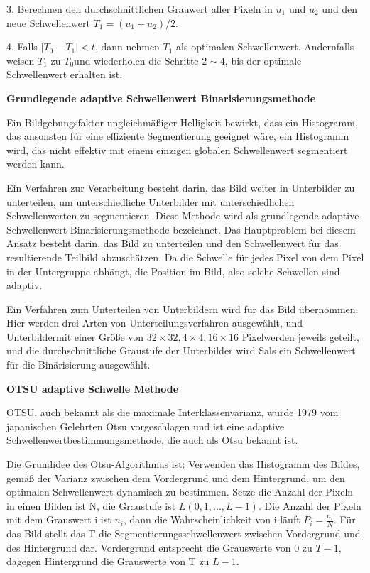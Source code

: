 3. Berechnen den durchschnittlichen Grauwert aller Pixeln in $ u_{1} $ und $ u_{2} $ und den neue Schwellenwert $ T_{1} = (u_{1}+u_{2})/2 $.

4. Falls $ |T_{0} - T_{1}| < t $, dann nehmen $ T_{1} $ als optimalen Schwellenwert. Andernfalls weisen $ T_{1} $ zu $ T_{0} $und wiederholen die Schritte $ 2\sim4 $, bis der optimale Schwellenwert erhalten ist.

\textbf{Grundlegende adaptive Schwellenwert Binarisierungsmethode}

Ein Bildgebungsfaktor ungleichmäßiger Helligkeit bewirkt, dass ein Histogramm, das ansonsten für eine effiziente Segmentierung geeignet wäre, ein Histogramm wird, das nicht effektiv mit einem einzigen globalen Schwellenwert segmentiert werden kann.

Ein Verfahren zur Verarbeitung besteht darin, das Bild weiter in Unterbilder zu unterteilen, um unterschiedliche Unterbilder mit unterschiedlichen Schwellenwerten zu segmentieren. Diese Methode wird als grundlegende adaptive Schwellenwert-Binarisierungsmethode bezeichnet. Das Hauptproblem bei diesem Ansatz besteht darin, das Bild zu unterteilen und den Schwellenwert für das resultierende Teilbild abzuschätzen. Da die Schwelle für jedes Pixel von dem Pixel in der Untergruppe abhängt, die Position im Bild, also solche Schwellen sind adaptiv. 

Ein Verfahren zum Unterteilen von Unterbildern wird für das Bild übernommen. Hier werden drei Arten von Unterteilungsverfahren ausgewählt, und Unterbildermit einer Größe von $ 32\times32,4 \times4,16\times16 $ Pixelwerden jeweils geteilt, und die durchschnittliche Graustufe der Unterbilder wird Sals ein Schwellenwert für die Binärisierung ausgewählt.


\textbf{OTSU adaptive Schwelle Methode}

OTSU\cite{Ostu}, auch bekannt als die maximale Interklassenvarianz, wurde 1979 vom japanischen Gelehrten Otsu vorgeschlagen und ist eine adaptive Schwellenwertbestimmungsmethode, die auch als Otsu bekannt ist.

Die Grundidee des Otsu-Algorithmus ist: Verwenden das Histogramm des Bildes, gemäß der Varianz zwischen dem Vordergrund und dem Hintergrund, um den optimalen Schwellenwert dynamisch zu bestimmen. Setze die Anzahl der Pixeln in einen Bilden ist N, die Graustufe ist $ L(0,1,...,L-1) $. Die Anzahl der Pixeln mit dem Grauswert i ist $ n_{i} $, dann die Wahrscheinlichkeit von i läuft $ P_{i} = \frac{n_{i}}{N} $. Für das Bild stellt das T die Segmentierungsschwellenwert zwischen Vordergrund und des Hintergrund dar. Vordergrund entsprecht die Grauswerte von 0 zu $ T-1 $, dagegen Hintergrund die Grauswerte von T zu $ L -1 $.

